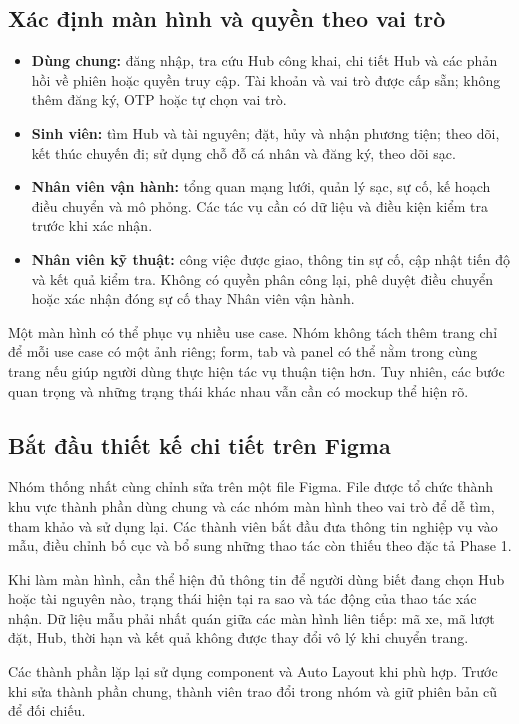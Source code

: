 \documentclass[10pt,a4paper]{article}
\begin{document}
\subsection{Xác định màn hình và quyền theo vai trò}
\begin{itemize}
  \item \textbf{Dùng chung:} đăng nhập, tra cứu Hub công khai, chi tiết Hub và các phản hồi về phiên hoặc quyền truy cập. Tài khoản và vai trò được cấp sẵn; không thêm đăng ký, OTP hoặc tự chọn vai trò.
  \item \textbf{Sinh viên:} tìm Hub và tài nguyên; đặt, hủy và nhận phương tiện; theo dõi, kết thúc chuyến đi; sử dụng chỗ đỗ cá nhân và đăng ký, theo dõi sạc.
  \item \textbf{Nhân viên vận hành:} tổng quan mạng lưới, quản lý sạc, sự cố, kế hoạch điều chuyển và mô phỏng. Các tác vụ cần có dữ liệu và điều kiện kiểm tra trước khi xác nhận.
  \item \textbf{Nhân viên kỹ thuật:} công việc được giao, thông tin sự cố, cập nhật tiến độ và kết quả kiểm tra. Không có quyền phân công lại, phê duyệt điều chuyển hoặc xác nhận đóng sự cố thay Nhân viên vận hành.
\end{itemize}

Một màn hình có thể phục vụ nhiều use case. Nhóm không tách thêm trang chỉ để mỗi use case có một ảnh riêng; form, tab và panel có thể nằm trong cùng trang nếu giúp người dùng thực hiện tác vụ thuận tiện hơn. Tuy nhiên, các bước quan trọng và những trạng thái khác nhau vẫn cần có mockup thể hiện rõ.

\subsection{Bắt đầu thiết kế chi tiết trên Figma}
Nhóm thống nhất cùng chỉnh sửa trên một file Figma. File được tổ chức thành khu vực thành phần dùng chung và các nhóm màn hình theo vai trò để dễ tìm, tham khảo và sử dụng lại. Các thành viên bắt đầu đưa thông tin nghiệp vụ vào mẫu, điều chỉnh bố cục và bổ sung những thao tác còn thiếu theo đặc tả Phase 1.

Khi làm màn hình, cần thể hiện đủ thông tin để người dùng biết đang chọn Hub hoặc tài nguyên nào, trạng thái hiện tại ra sao và tác động của thao tác xác nhận. Dữ liệu mẫu phải nhất quán giữa các màn hình liên tiếp: mã xe, mã lượt đặt, Hub, thời hạn và kết quả không được thay đổi vô lý khi chuyển trang.

Các thành phần lặp lại sử dụng component và Auto Layout khi phù hợp. Trước khi sửa thành phần chung, thành viên trao đổi trong nhóm và giữ phiên bản cũ để đối chiếu.
\end{document}
